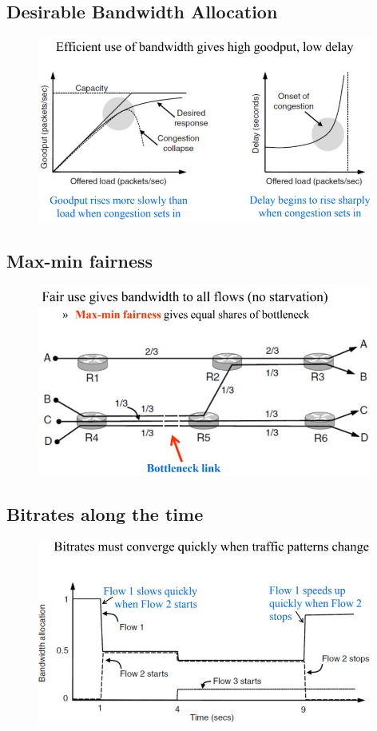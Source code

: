\documentclass[../resumosRCOM.tex]{subfiles}
\begin{document}
\subsection{Desirable Bandwidth Allocation}
\begin{figure}[h]
    \centering
    \includegraphics[width=11cm]{images/trans15.JPG}
\end{figure}

\subsection{Max-min fairness}
\begin{figure}[h]
    \centering
    \includegraphics[width=11cm]{images/trans16.JPG}
\end{figure}

\subsection{Bitrates along the time}
\begin{figure}[h]
    \centering
    \includegraphics[width=11cm]{images/trans17.JPG}
\end{figure}
\end{document}
